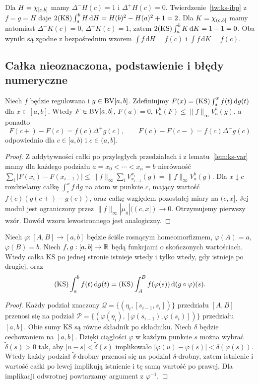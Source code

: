 \begin{przyklad}
Dla $H=\chi_{[c,b]}$ mamy $\Delta^-H(c)=1$ i $\Delta^+H(c)=0$. Twierdzenie~\ref{tw:ks-ibp} z $f=g=H$ daje
$2(\mathrm{KS})\int_a^b H\,\mathrm dH=H(b)^2-H(a)^2+1=2$. Dla $K=\chi_{(c,b]}$ mamy natomiast $\Delta^-K(c)=0$, $\Delta^+K(c)=1$, zatem $2(\mathrm{KS})\int_a^b K\,\mathrm dK=1-1=0$. Oba wyniki są zgodne z bezpośrednim wzorem $\int f\,\mathrm dH=f(c)$ i $\int f\,\mathrm dK=f(c)$.
\end{przyklad}

\subsection*{Całka nieoznaczona, podstawienie i błędy numeryczne}
\begin{twierdzenie}
\label{tw:ks-primitive}
Niech $f$ będzie regulowana i $g\in\mathrm{BV}[a,b]$. Zdefiniujmy $F(x)=(\mathrm{KS})\int_a^x f(t)\,\mathrm dg(t)$ dla $x\in[a,b]$. Wtedy $F\in\mathrm{BV}[a,b]$, $F(a)=0$, $V_a^b(F)\le\|f\|_\infty V_a^b(g)$, a ponadto
\[
 F(c+)-F(c)=f(c)\Delta^+g(c),\qquad
 F(c)-F(c-)=f(c)\Delta^-g(c)
\]
odpowiednio dla $c\in[a,b)$ i $c\in(a,b]$.
\end{twierdzenie}
\begin{proof}
Z addytywności całki po przyległych przedziałach i z lematu~\ref{lem:ks-var} mamy dla każdego podziału $a=x_0<\cdots<x_n=b$ nierówność $\sum_i|F(x_i)-F(x_{i-1})|\le\|f\|_\infty\sum_i V_{x_{i-1}}^{x_i}(g)=\|f\|_\infty V_a^b(g)$. Dla $x\downarrow c$ rozdzielamy całkę $\int_c^x f\,\mathrm dg$ na atom w punkcie $c$, mający wartość $f(c)(g(c+)-g(c))$, oraz całkę względem pozostałej miary na $(c,x]$. Jej moduł jest ograniczony przez $\|f\|_\infty|\mu_g|((c,x])\to0$. Otrzymujemy pierwszy wzór. Dowód wzoru lewostronnego jest analogiczny.
\end{proof}

\begin{twierdzenie}
\label{tw:ks-substitution}
Niech $\varphi:[A,B]\to[a,b]$ będzie ściśle rosnącym homeomorfizmem, $\varphi(A)=a$, $\varphi(B)=b$. Niech $f,g:[a,b]\to\mathbb R$ będą funkcjami o skończonych wartościach. Wtedy całka KS po jednej stronie istnieje wtedy i tylko wtedy, gdy istnieje po drugiej, oraz
\[
 (\mathrm{KS})\int_a^b f(t)\,\mathrm dg(t)
 =(\mathrm{KS})\int_A^B f(\varphi(s))\,\mathrm d(g\circ\varphi)(s).
\]
\end{twierdzenie}
\begin{proof}
Każdy podział znaczony $\mathcal Q=\{(\eta_i,[s_{i-1},s_i])\}$ przedziału $[A,B]$ przenosi się na podział $\mathcal P=\{(\varphi(\eta_i),[\varphi(s_{i-1}),\varphi(s_i)])\}$ przedziału $[a,b]$. Obie sumy KS są równe składnik po składniku. Niech $\delta$ będzie cechowaniem na $[a,b]$. Dzięki ciągłości $\varphi$ w każdym punkcie $s$ można wybrać $\widetilde\delta(s)>0$ tak, aby $|u-s|<\widetilde\delta(s)$ implikowało $|\varphi(u)-\varphi(s)|<\delta(\varphi(s))$. Wtedy każdy podział $\widetilde\delta$-drobny przenosi się na podział $\delta$-drobny, zatem istnienie i wartość całki po lewej implikują istnienie i tę samą wartość po prawej. Dla implikacji odwrotnej powtarzamy argument z $\varphi^{-1}$.
\end{proof}

